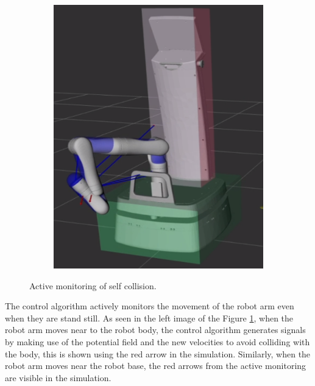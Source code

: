 \documentclass[a4paper, 11.5pt, conference]{ieeeconf}      %
\begin{document}
\begin{figure}[H]
\begin{subfigure}[t]{0.20\textwidth}
	\end{subfigure}%
	~ 
	\begin{subfigure}[t]{0.20\textwidth}
		\centering
		\includegraphics[scale=0.25]{images/robot2.png}
		
	\end{subfigure}
	\caption{Active monitoring of self collision.}
	\label{fig:robot1}
\end{figure}

The control algorithm actively monitors the movement of the robot arm even when they are stand still. As seen in the left image of the Figure \ref{fig:robot1}, when the robot arm moves near to the robot body, the control algorithm generates signals by making use of the potential field and the new velocities to avoid colliding with the body, this is shown using the red arrow in the simulation. Similarly, when the robot arm moves near the robot base, the red arrows from the active monitoring are visible in the simulation.
\end{document}
